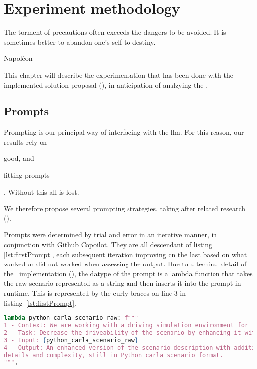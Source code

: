 \chapter{Experiment methodology}\label{chp:experiments}

\epigraph{The torment of precautions often exceeds the dangers to be avoided. It is sometimes better to abandon one's self to destiny.}{Napoléon}

This chapter will describe the experimentation that has been done with the implemented solution
proposal (), in anticipation of analzying the .

\section{Prompts}

Prompting is our principal way of interfacing with the \acrshort{llm}. For this reason, our results
rely on \begin{inparaenum}
    \item good, and
    \item fitting prompts
\end{inparaenum}. Without this all is lost.

We therefore propose several prompting strategies, taking after related research
().

Prompts were determined by trial and error in an iterative manner, in
conjunction with Github Copoilot. They are all descendant of listing
\ref{lst:firstPrompt}, each subsequent iteration improving on the last based on
what worked or did not worked when assessing the output.
Due to a techical detail of the
\hefe~implementation (), the datype of the prompt is
a lambda function that takes the raw scenario represented as a string and then
inserts it into the prompt in runtime. This is represented by the curly braces
on line \num{3} in listing~\ref{lst:firstPrompt}.

\begin{lstlisting}[caption={The first prompt.}, label={lst:firstPrompt}, language={Python}]
lambda python_carla_scenario_raw: f"""
1 - Context: We are working with a driving simulation environment for the Carla simulator.
2 - Task: Decrease the driveability of the scenario by enhancing it with more details and complexity.
3 - Input: {python_carla_scenario_raw}
4 - Output: An enhanced version of the scenario description with additional
details and complexity, still in Python carla scenario format.
""",
\end{lstlisting}

